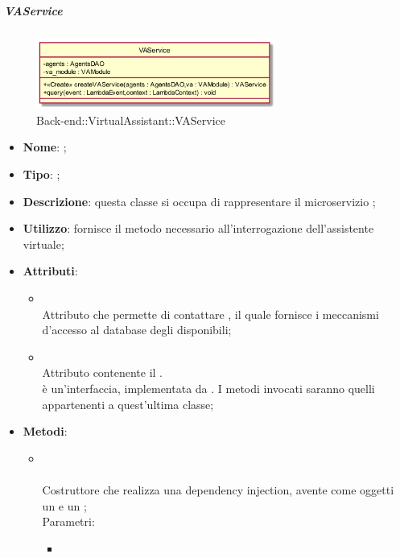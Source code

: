 \FloatBarrier

\hypertarget{VAService_label}{\subparagraph{VAService}}
\begin{figure}[h]
	\centering
	\includegraphics[width=0.70\textwidth,height=\textheight,keepaspectratio]{images/ClassVAService.png}
	\caption{Back-end::VirtualAssistant::VAService}
\end{figure}
\begin{itemize}
	\item \textbf{Nome}: ;
	\item \textbf{Tipo}: ;
	\item \textbf{Descrizione}: questa classe si occupa di rappresentare il microservizio ;
	\item \textbf{Utilizzo}: fornisce il metodo necessario all'interrogazione dell'assistente virtuale;
	\item \textbf{Attributi}:
	\begin{itemize}
		\item[]  \\
		Attributo che permette di contattare , il quale fornisce i meccanismi d'accesso al database degli  disponibili;
		\item[]  \\
		Attributo contenente il . \\
 è un'interfaccia, implementata da .  I metodi invocati saranno quelli appartenenti a quest'ultima classe;
	\end{itemize}
	\item \textbf{Metodi}:
	\begin{itemize}
		\item[] \\ \\		Costruttore che realizza una dependency injection, avente come oggetti un  e un ;\\
		Parametri:
		\begin{itemize}
			\item {} \\

\end{itemize}
\end{itemize}
\end{itemize}
